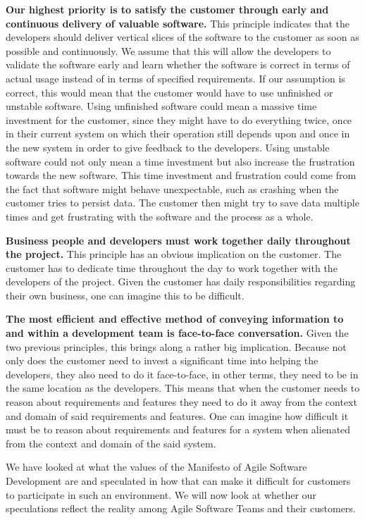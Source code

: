 \textbf{Our highest priority is to satisfy the customer through early and continuous delivery of valuable software.} 
This principle indicates that the developers should deliver vertical slices of the software to the customer as soon as possible and continuously. 
We assume that this will allow the developers to validate the software early and learn whether the software is correct in terms of actual usage instead of in terms of specified requirements.
If our assumption is correct, this would mean that the customer would have to use unfinished or unstable software.
Using unfinished software could mean a massive time investment for the customer, since they might have to do everything twice, once in their current system on which their operation still depends upon and once in the new system in order to give feedback to the developers. 
Using unstable software could not only mean a time investment but also increase the frustration towards the new software.
This time investment and frustration could come from the fact that software might behave unexpectable, such as crashing when the customer tries to persist data. The customer then might try to save data multiple times and get frustrating with the software and the process as a whole.

\textbf{Business people and developers must work together daily throughout the project.}
This principle has an obvious implication on the customer. 
The customer has to dedicate time throughout the day to work together with the developers of the project. 
Given the customer has daily responsibilities regarding their own business, one can imagine this to be difficult.

\textbf{The most efficient and effective method of conveying information to and within a development team is face-to-face conversation.}
Given the two previous principles, this brings along a rather big implication.
Because not only does the customer need to invest a significant time into helping the developers, they also need to do it face-to-face, in other terms, they need to be in the same location as the developers. 
This means that when the customer needs to reason about requirements and features they need to do it away from the context and domain of said requirements and features. 
One can imagine how difficult it must be to reason about requirements and features for a system when alienated from the context and domain of the said system.

We have looked at what the values of the Manifesto of Agile Software Development are and speculated in how that can make it difficult for customers to participate in such an environment. 
We will now look at whether our speculations reflect the reality among Agile Software Teams and their customers.

